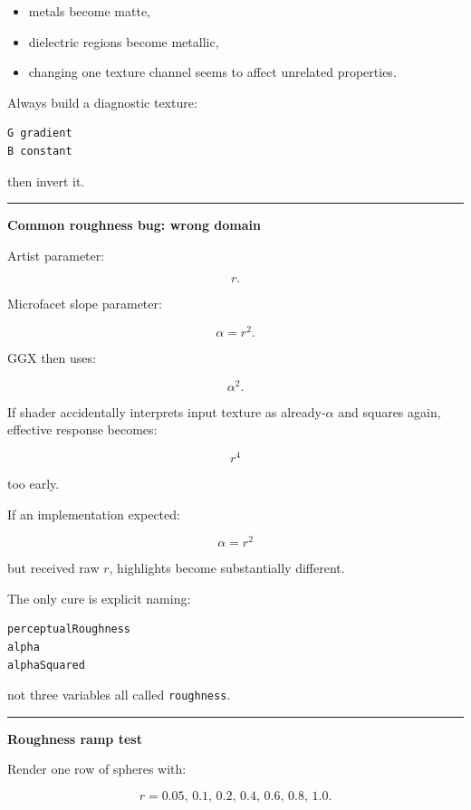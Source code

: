 \begin{itemize}
\tightlist
\item
  metals become matte,
\item
  dielectric regions become metallic,
\item
  changing one texture channel seems to affect unrelated properties.
\end{itemize}

Always build a diagnostic texture:

\begin{verbatim}
G gradient
B constant
\end{verbatim}

then invert it.

\begin{center}\rule{0.5\linewidth}{0.5pt}\end{center}

\textbf{Common roughness bug: wrong domain}

Artist parameter:

\[
r.
\]

Microfacet slope parameter:

\[
\alpha=r^2.
\]

GGX then uses:

\[
\alpha^2.
\]

If shader accidentally interprets input texture as already-\(\alpha\) and squares again, effective response becomes:

\[
r^4
\]

too early.

If an implementation expected:

\[
\alpha=r^2
\]

but received raw \(r\), highlights become substantially different.

The only cure is explicit naming:

\begin{verbatim}
perceptualRoughness
alpha
alphaSquared
\end{verbatim}

not three variables all called \texttt{roughness}.

\begin{center}\rule{0.5\linewidth}{0.5pt}\end{center}

\textbf{Roughness ramp test}

Render one row of spheres with:

\[
r=
0.05,\,
0.1,\,
0.2,\,
0.4,\,
0.6,\,
0.8,\,
1.0.
\]

